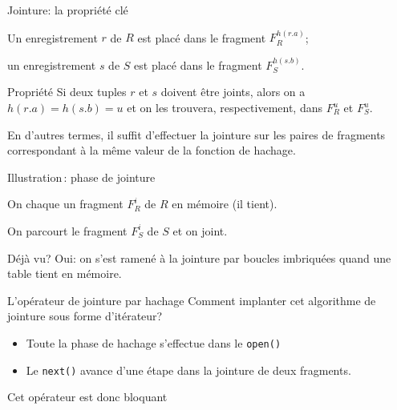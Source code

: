 \begin{frame}{Jointure: la propriété clé}

Un enregistrement  $r$ de $R$ est  
placé dans le fragment  $F_R^{h(r.a)}$;

\vfill

un enregistrement  $s$ de $S$ est  
placé dans le fragment  $F_S^{h(s.b)}$.

\vfill

\begin{block}{Propriété}
Si deux tuples  $r$ et  $s$
doivent être joints, alors on a  $h(r.a) = h(s.b)=u$ 
et on les trouvera, respectivement, dans  $F_R^u$
et $F_S^u$.
\end{block}

\vfill

\alert{En d'autres termes, il suffit d'effectuer
la jointure sur les paires de fragments correspondant à la même valeur
de la fonction de hachage.}
\end{frame}


\begin{frame}{Illustration\,: phase de jointure}

On chaque un fragment $F_R^i$ de $R$ en mémoire (il tient).

\vfill

On parcourt le fragment $F_S^i$ de $S$ et on joint.

\vfill


\vfill

\alert{Déjà vu?} Oui: on s'est ramené à la jointure par boucles imbriquées
quand une table tient en mémoire.
\end{frame}

\begin{frame}{L'opérateur de jointure par hachage}
Comment implanter cet algorithme de jointure sous forme d'itérateur? 

\begin{itemize}
  \item Toute la phase de hachage s'effectue dans le \texttt{open()}
  \item Le \texttt{next()} avance d'une étape dans la jointure de deux fragments.
\end{itemize}

\alert{Cet opérateur est donc bloquant}

\end{frame}


